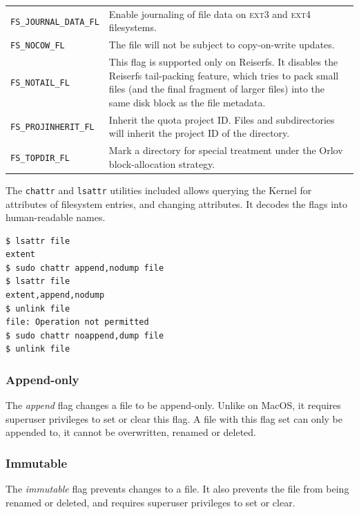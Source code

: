 \documentclass[a4paper]{article}
\begin{document}
\begin{table}
\begin{tabular}{@{}lp{8cm}@{}}
\verb|FS_JOURNAL_DATA_FL|
& Enable journaling of file data on \textsc{ext3} and \textsc{ext4} filesystems.\\

\verb|FS_NOCOW_FL|
& The file will not be subject to copy-on-write updates.\\

\verb|FS_NOTAIL_FL|
& This flag is supported only on Reiserfs.  It disables the Reiserfs tail-packing feature, which tries to pack small files (and the final fragment of larger files)  into  the  same  disk block as the file metadata.\\

\verb|FS_PROJINHERIT_FL|
& Inherit the quota project ID.  Files and subdirectories will inherit the project ID of the directory.\\

\verb|FS_TOPDIR_FL|
& Mark a directory for special treatment under the Orlov block-allocation strategy.\\
\bottomrule
\end{tabular}
\end{table}

The \verb|chattr| and \verb|lsattr| utilities included allows querying the Kernel for attributes of filesystem entries, and changing attributes. It decodes the flags into human-readable names.

\begin{verbatim}
$ lsattr file
extent
$ sudo chattr append,nodump file
$ lsattr file
extent,append,nodump
$ unlink file
file: Operation not permitted
$ sudo chattr noappend,dump file
$ unlink file
\end{verbatim}

\subsubsection{Append-only}

The \emph{append} flag changes a file to be append-only. Unlike on MacOS, it requires superuser privileges to set or clear this flag. A file with this flag set can only be appended to, it cannot be overwritten, renamed or deleted.

\subsubsection{Immutable}

The \emph{immutable} flag prevents changes to a file. It also prevents the file from being renamed or deleted, and requires superuser privileges to set or clear.
\end{document}
